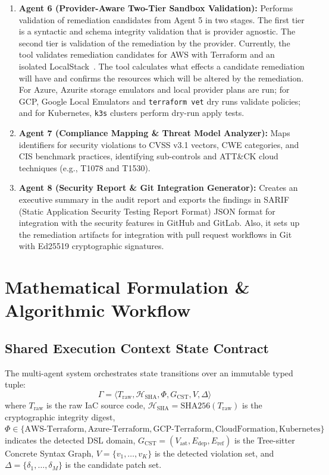 \documentclass[runningheads]{llncs}
\begin{document}
\begin{enumerate}
    \item \textbf{Agent 6 (Provider-Aware Two-Tier Sandbox Validation):} Performs validation of remediation candidates from Agent 5 in two stages. The first tier is a syntactic and schema integrity validation that is provider agnostic. The second tier is validation of the remediation by the provider. Currently, the tool validates remediation candidates for AWS with Terraform and an isolated LocalStack~\cite{localstack2024}. The tool calculates what effects a candidate remediation will have and confirms the resources which will be altered by the remediation. For Azure, Azurite storage emulators and local provider plans are run; for GCP, Google Local Emulators and \texttt{terraform vet} dry runs validate policies; and for Kubernetes, \texttt{k3s} clusters perform dry-run apply tests.
    \item \textbf{Agent 7 (Compliance Mapping \& Threat Model Analyzer):} Maps identifiers for security violations to CVSS v3.1 vectors, CWE categories, and CIS benchmark practices, identifying sub-controls and ATT\&CK cloud techniques (e.g., T1078 and T1530).
    \item \textbf{Agent 8 (Security Report \& Git Integration Generator):} Creates an executive summary in the audit report and exports the findings in SARIF (Static Application Security Testing Report Format) JSON format for integration with the security features in GitHub and GitLab. Also, it sets up the remediation artifacts for integration with pull request workflows in Git with Ed25519 cryptographic signatures.
\end{enumerate}


\section{Mathematical Formulation \& Algorithmic Workflow}

\subsection{Shared Execution Context State Contract}
The multi-agent system orchestrates state transitions over an immutable typed tuple:
\begin{equation}
\Gamma = \langle T_{\mathrm{raw}}, \mathcal{H}_{\mathrm{SHA}}, \Phi, G_{\mathrm{CST}}, V, \Delta \rangle
\end{equation}
where $T_{\mathrm{raw}}$ is the raw IaC source code, $\mathcal{H}_{\mathrm{SHA}} = \mathrm{SHA256}(T_{\mathrm{raw}})$ is the cryptographic integrity digest, $\Phi \in \{\text{AWS-Terraform}, \text{Azure-Terraform}, \text{GCP-Terraform}, \text{CloudFormation}, \text{Kubernetes}\}$ indicates the detected DSL domain, $G_{\mathrm{CST}} = (V_{\mathrm{ast}}, E_{\mathrm{dep}}, E_{\mathrm{ref}})$ is the Tree-sitter Concrete Syntax Graph, $V = \{v_1, \dots, v_K\}$ is the detected violation set, and $\Delta = \{\delta_1, \dots, \delta_M\}$ is the candidate patch set.
\end{document}
